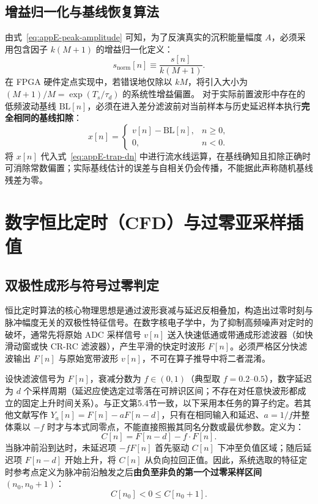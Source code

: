 \subsection{增益归一化与基线恢复算法}

由式~\eqref{eq:appE-peak-amplitude} 可知，为了反演真实的沉积能量幅度 $A$，必须采用包含因子 $k(M+1)$ 的增益归一化定义：
\begin{equation}\label{eq:appE-snorm}
s_{\mathrm{norm}}[n] \equiv \frac{s[n]}{k(M + 1)}.
\end{equation}
在 FPGA 硬件定点实现中，若错误地仅除以 $k M$，将引入大小为 $(M+1)/M = \exp(T_s/\tau_d)$ 的系统性增益偏置。
对于实际前置波形中存在的低频波动基线 $\mathrm{BL}[n]$，必须在进入差分滤波前对当前样本与历史延迟样本执行\textbf{完全相同的基线扣除}：
\begin{equation}\label{eq:appE-baseline-sub}
x[n] = \begin{cases} v[n] - \mathrm{BL}[n], & n \ge 0, \\ 0, & n < 0. \end{cases}
\end{equation}
将 $x[n]$ 代入式~\eqref{eq:appE-trap-dn} 中进行流水线运算，在基线确知且扣除正确时可消除常数偏置；实际基线估计的误差与自相关仍会传播，不能据此声称随机基线残差为零。

\section{数字恒比定时（CFD）与过零亚采样插值}\label{sec:appE-cfd}

\subsection{双极性成形与符号过零判定}

恒比定时算法的核心物理思想是通过波形衰减与延迟反相叠加，构造出过零时刻与脉冲幅度无关的双极性特征信号。在数字核电子学中，为了抑制高频噪声对定时的破坏，通常先将原始 ADC 采样信号 $v[n]$ 送入快速低通或带通成形滤波器（如快滑动窗或快 CR-RC 滤波器），产生平滑的快定时波形 $F[n]$。必须严格区分快滤波输出 $F[n]$ 与原始宽带波形 $v[n]$，不可在算子推导中将二者混淆。

设快滤波信号为 $F[n]$，衰减分数为 $f \in (0, 1)$（典型取 $f = 0.2$--$0.5$），数字延迟为 $d$ 个采样周期（延迟应使选定过零落在可辨识区间；不存在对任意快波形都成立的固定上升时间关系）。与正文第5.4节一致，以下采用本任务的算子约定。若其他文献写作 $Y_a[n]=F[n]-aF[n-d]$，只有在相同输入和延迟、$a=1/f$并整体乘以 $-f$ 时才与本式同零点，不能直接照搬其同名分数或最优参数。定义为：
\begin{equation}\label{eq:appE-cfd-bipolar}
C[n] = F[n - d] - f \cdot F[n].
\end{equation}
当脉冲前沿到达时，未延迟项 $-f F[n]$ 首先驱动 $C[n]$ 下冲至负值区域；随后延迟项 $F[n-d]$ 开始上升，将 $C[n]$ 从负向拉回正值。因此，系统选取的特征定时参考点定义为脉冲前沿触发之后\textbf{由负至非负的第一个过零采样区间} $(n_0, n_0+1)$：
\begin{equation}\label{eq:appE-zero-cross-condition}
C[n_0] < 0 \le C[n_0 + 1].
\end{equation}

